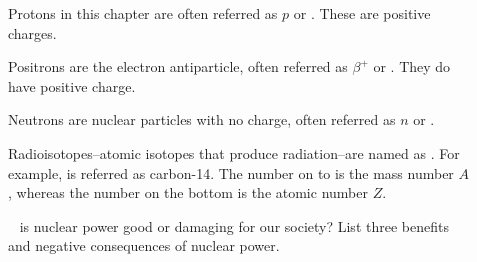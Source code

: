 \documentclass[main.tex]{subfiles}
\begin{document}
\begin{description}
\item[] Protons in this chapter are often referred as $p$ or . These are positive charges.
\item[] Positrons are the electron antiparticle, often referred as $\beta^+$ or . They do have positive charge.
\item[] Neutrons are nuclear particles with no charge, often referred as $n$ or .

\item[] Radioisotopes--atomic isotopes that produce radiation--are named as . For example,  is referred as carbon-14. The number on to is the mass number $A$, whereas the number on the bottom is the atomic number $Z$.

  \begin{marginfigure}
\begin{tcolorbox}[enhanced,colback=red!5!white,colframe=black!50!red,boxrule=1pt,
  arc=0pt,outer arc=0pt,drop heavy lifted shadow]
\faGears\ 
 is nuclear power good or damaging for our society? List three benefits and negative consequences of nuclear power.\end{tcolorbox}
 \end{marginfigure}


\end{description}
\end{document}
